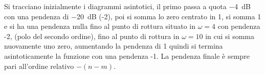 Si tracciano inizialmente i diagrammi asintotici, il primo passa a quota
\SI{-4}{\deci\bel} con una pendenza di \SI{-20}{\deci\bel} (-2), poi si somma lo
zero centrato in 1, si somma 1 e si ha una pendenza nulla fino al punto di
rottura situato in $\omega=4$ con pendenza -2, (polo del secondo ordine),
fino al punto di rottura in $\omega=10$ in cui si somma nuovamente uno
zero, aumentando la pendenza di 1 quindi si termina asintoticamente la funzione
con una pendenza -1.
La pendenza finale è sempre pari all'ordine relativo $-(n-m)$.

